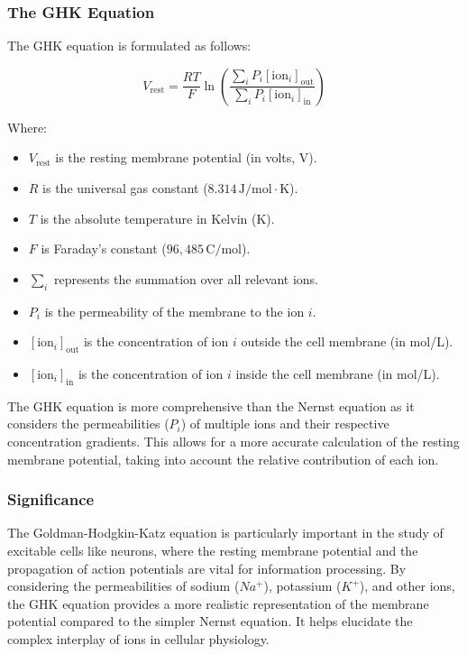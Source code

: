 \documentclass{article}
\begin{document}
\subsubsection{The GHK Equation}

The GHK equation is formulated as follows:

\[
V_{\text{rest}} = \frac{RT}{F} \ln \left(\frac{\sum_i P_i[\text{ion}_i]_{\text{out}}}{\sum_i P_i[\text{ion}_i]_{\text{in}}}\right)
\]

Where:
\begin{itemize}
  \item \(V_{\text{rest}}\) is the resting membrane potential (in volts, V).
  \item \(R\) is the universal gas constant (\(8.314 \, \text{J/mol} \cdot \text{K}\)).
  \item \(T\) is the absolute temperature in Kelvin (K).
  \item \(F\) is Faraday's constant (\(96,485 \, \text{C/mol}\)).
  \item \(\sum_i\) represents the summation over all relevant ions.
  \item \(P_i\) is the permeability of the membrane to the ion \(i\).
  \item \([\text{ion}_i]_{\text{out}}\) is the concentration of ion \(i\) outside the cell membrane (in mol/L).
  \item \([\text{ion}_i]_{\text{in}}\) is the concentration of ion \(i\) inside the cell membrane (in mol/L).
\end{itemize}

The GHK equation is more comprehensive than the Nernst equation as it considers the permeabilities (\(P_i\)) of multiple ions and their respective concentration gradients. This allows for a more accurate calculation of the resting membrane potential, taking into account the relative contribution of each ion.

\subsubsection{Significance}

The Goldman-Hodgkin-Katz equation is particularly important in the study of excitable cells like neurons, where the resting membrane potential and the propagation of action potentials are vital for information processing. By considering the permeabilities of sodium (\(Na^+\)), potassium (\(K^+\)), and other ions, the GHK equation provides a more realistic representation of the membrane potential compared to the simpler Nernst equation. It helps elucidate the complex interplay of ions in cellular physiology.
\end{document}
